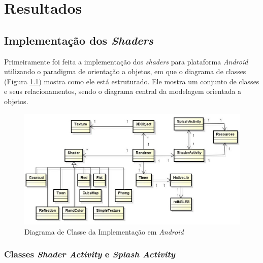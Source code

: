\chapter[Resultados]{Resultados}

\section{Implementação dos \textit{Shaders}}

	Primeiramente foi feita a implementação dos \textit{shaders} para plataforma \textit{Android} utilizando o paradigma de orientação a objetos, em que o diagrama de classes (Figura \ref{class_diagram}) mostra como ele está estruturado. Ele mostra um conjunto de classes e seus relacionamentos, sendo o diagrama central da modelagem orientada a objetos. 

	\begin{figure}[h]
	\centering
		\includegraphics[keepaspectratio=true,scale=0.6]{figuras/class_diagram.jpg}
	\caption{Diagrama de Classe da Implementação em \textit{Android}}
	\label{class_diagram}
	\end{figure}

	\subsection{Classes \textit{Shader Activity} e \textit{Splash Activity}}

